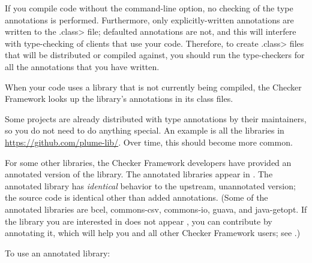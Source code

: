 If you compile code without the 
command-line option, no checking of the type
annotations is performed.  Furthermore, only explicitly-written annotations
are written to the \<.class> file; defaulted annotations are not, and this
will interfere with type-checking of clients that use your code.
Therefore, to create
\<.class> files that will be distributed or compiled against, you should run the
type-checkers for all the annotations that you have written.



When your code uses a library that is not currently being compiled, the
Checker Framework looks up the library's annotations in its class files.

Some projects are already distributed with type annotations by their
maintainers, so you do not need to do anything special.
An example is all the libraries in \url{https://github.com/plume-lib/}.
Over time, this should become more common.

For some other libraries, the Checker Framework developers have provided an
annotated version of the library.
The annotated libraries appear in
.
The annotated library has \emph{identical} behavior to the upstream,
unannotated version; the source code is identical other than added
annotations.
%
(Some of the annotated libraries are
bcel,
commons-csv,
commons-io,
guava,
and
java-getopt.
If the library you are interested in does not appear
, you can contribute by annotating it, which will
help you and all other Checker Framework users; see
.)

To use an annotated library:

